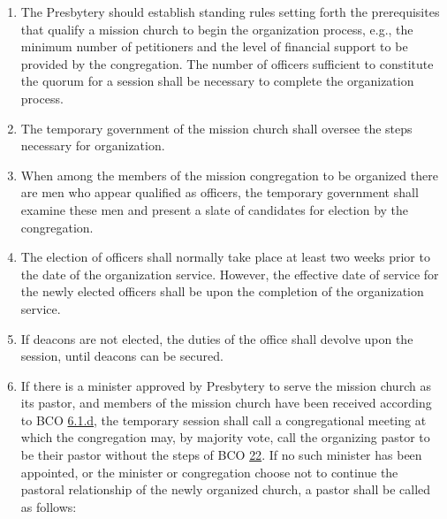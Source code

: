 \documentclass[
]{book}
\providecommand{\tightlist}{%
  \setlength{\itemsep}{0pt}\setlength{\parskip}{0pt}}
\begin{document}
\begin{enumerate}
  \begin{enumerate}
  \def\labelenumii{\alph{enumii}.}
  \tightlist
  \item
    The Presbytery should establish standing rules setting forth the prerequisites that qualify a mission church to begin the organization process, e.g., the minimum number of petitioners and the level of financial support to be provided by the congregation. The number of officers sufficient to constitute the quorum for a session shall be necessary to complete the organization process.
  \item
    The temporary government of the mission church shall oversee the steps necessary for organization.
  \item
    When among the members of the mission congregation to be organized there are men who appear qualified as officers, the temporary government shall examine these men and present a slate of candidates for election by the congregation.
  \item
    The election of officers shall normally take place at least two weeks prior to the date of the organization service. However, the effective date of service for the newly elected officers shall be upon the completion of the organization service.
  \item
    If deacons are not elected, the duties of the office shall devolve upon the session, until deacons can be secured.
  \item
    If there is a minister approved by Presbytery to serve the mission church as its pastor, and members of the mission church have been received according to BCO \protect\hyperlink{6.1.d}{6.1.d}, the temporary session shall call a congregational meeting at which the congregation may, by majority vote, call the organizing pastor to be their pastor without the steps of BCO \protect\hyperlink{22}{22}. If no such minister has been appointed, or the minister or congregation choose not to continue the pastoral relationship of the newly organized church, a pastor shall be called as follows:


\end{enumerate}
\end{enumerate}
\end{document}
